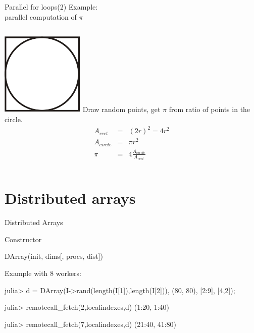\documentclass{beamer}
\begin{document}
	\begin{frame}{Parallel for loops(2)}
		Example: \\
		parallel computation of $\pi$
		\begin{columns}[c]
			\includegraphics[height=4cm]{figures/square_circle.jpg}
			Draw random points, get $\pi$ from ratio of points in the circle.
			\begin{equation*}
				\begin{array}{rcl}		
					A_{rect} & = & (2r)^2 = 4r^2 \\
					A_{circle} & = & \pi r^2 \\
					\pi & = & 4\frac{A_{circle}}{A_{rect}}
				\end{array}
			\end{equation*}
		\end{columns}
	\end{frame}

	\section{Distributed arrays}
	\begin{frame}[fragile]{Distributed Arrays}
		\begin{block}{Constructor}
		\begin{semiverbatim}
		DArray(init, dims[, procs, dist])
		\end{semiverbatim}
		\end{block}
		\begin{block}{Example with 8 workers:}
		\begin{semiverbatim}
		julia> d = DArray(I->rand(length(I[1]),length(I[2])),
											(80, 80), 
											[2:9], 
											[4,2]);	
		
		julia> remotecall\_fetch(2,localindexes,d)
		(1:20, 1:40)
		
		julia> remotecall\_fetch(7,localindexes,d)
		(21:40, 41:80)
		\end{semiverbatim}
		\end{block}
	\end{frame}
\end{document}
